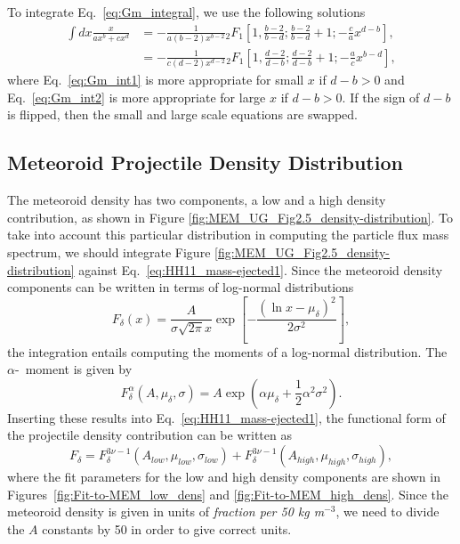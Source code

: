 \documentclass{hitec}
\begin{document}
To integrate Eq.\ \eqref{eq:Gm_integral}, we use the following solutions
\begin{align}\label{eq:Gm_int1}
\int dx\frac{x}{ax^b+cx^d} &= -\frac{1}{a(b-2)x^{b-2}} {}_2F_1\left[1, \frac{b-2}{b-d}; \frac{b-2}{b-d}+1; -\frac{c}{a}x^{d-b}\right],\\\label{eq:Gm_int2}
&= -\frac{1}{c(d-2)x^{d-2}} {}_2F_1\left[1, \frac{d-2}{d-b}; \frac{d-2}{d-b}+1; -\frac{a}{c}x^{b-d}\right],
\end{align}
where Eq.\ \ref{eq:Gm_int1} is more appropriate for small $x$ if $d-b > 0$ and Eq.\ \ref{eq:Gm_int2} is more appropriate for large $x$ if $d-b > 0$. If the sign of $d-b$ is flipped, then the small and large scale equations are swapped.


\subsection{Meteoroid Projectile Density Distribution}

The meteoroid density has two components, a low and a high density contribution, as shown in Figure \ref{fig:MEM_UG_Fig2.5_density-distribution}. To take into account this particular distribution in computing the particle flux mass spectrum, we should integrate Figure \ref{fig:MEM_UG_Fig2.5_density-distribution} against Eq.\ \ref{eq:HH11_mass-ejected1}. Since the meteoroid density components can be written in terms of log-normal distributions
\begin{equation}\label{eq:log-normal_distribution}
F_\delta(x) = \frac{A}{\sigma\sqrt{2\pi}x}\exp\left[-\frac{(\ln x-\mu_\delta)^2}{2\sigma^2}\right],
\end{equation}
the integration entails computing the moments of a log-normal distribution. The $\alpha$-~moment is given by
\begin{equation}
F^\alpha_\delta(A,\mu_\delta,\sigma) = A\exp\left(\alpha\mu_\delta+\frac{1}{2}\alpha^2\sigma^2\right).
\end{equation}
Inserting these results into Eq.\ \ref{eq:HH11_mass-ejected1}, the functional form of the projectile density contribution can be written as
\begin{equation}
F_\delta = F^{3\nu-1}_\delta(A_{low}, \mu_{low},\sigma_{low}) + F^{3\nu-1}_\delta(A_{high}, \mu_{high},\sigma_{high}),
\end{equation}
where the fit parameters for the low and high density components are shown in Figures~\ref{fig:Fit-to-MEM_low_dens} and \ref{fig:Fit-to-MEM_high_dens}. Since the meteoroid density is given in units of \textit{fraction per 50 kg m$^{-3}$}, we need to divide the $A$ constants by 50 in order to give correct units.
\end{document}

